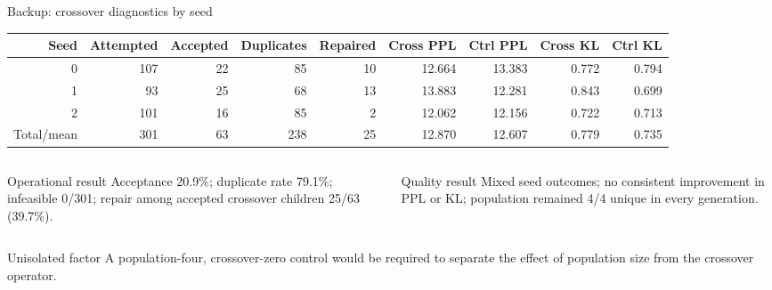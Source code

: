 \documentclass[aspectratio=169,10pt]{beamer}
\begin{document}
\begin{frame}{Backup: crossover diagnostics by seed}
\scriptsize
\centering
\begin{tabular}{rrrrrrrrr}
\toprule
Seed & Attempted & Accepted & Duplicates & Repaired & Cross PPL & Ctrl PPL & Cross KL & Ctrl KL \\
\midrule
0 & 107 & 22 & 85 & 10 & 12.664 & 13.383 & 0.772 & 0.794 \\
1 & 93  & 25 & 68 & 13 & 13.883 & 12.281 & 0.843 & 0.699 \\
2 & 101 & 16 & 85 & 2  & 12.062 & 12.156 & 0.722 & 0.713 \\
\midrule
Total/mean & 301 & 63 & 238 & 25 & 12.870 & 12.607 & 0.779 & 0.735 \\
\bottomrule
\end{tabular}

\vspace{0.35cm}
\begin{columns}[T,onlytextwidth]
\begin{column}{0.48\textwidth}
\begin{block}{Operational result}
Acceptance 20.9\%; duplicate rate 79.1\%; infeasible 0/301; repair among accepted crossover children 25/63 (39.7\%).
\end{block}
\end{column}
\begin{column}{0.48\textwidth}
\begin{block}{Quality result}
Mixed seed outcomes; no consistent improvement in PPL or KL; population remained 4/4 unique in every generation.
\end{block}
\end{column}
\end{columns}

\begin{alertblock}{Unisolated factor}
A population-four, crossover-zero control would be required to separate the effect of population size from the crossover operator.
\end{alertblock}
\end{frame}
\end{document}
